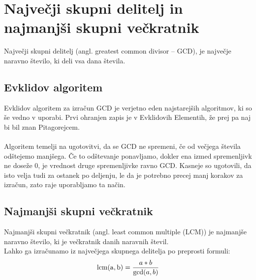 \documentclass[10pt,a4paper,oneside]{book}
\begin{document}
\section{Največji skupni delitelj in najmanjši skupni večkratnik}
Največji skupni delitelj (angl. greatest common divisor -- GCD), je največje naravno število, ki deli vsa dana števila.
\subsection{Evklidov algoritem}
Evklidov algoritem za izračun GCD je verjetno eden najstarejših algoritmov, ki so še vedno v uporabi. Prvi ohranjen zapis je v Evklidovih Elementih\cite{elementi}, že prej pa naj bi bil znan Pitagorejcem. \\
\\
Algoritem temelji na ugotovitvi, da se GCD ne spremeni, če od večjega števila odštejemo manjšega. Če to odštevanje ponavljamo, dokler ena izmed spremenljivk ne doseže 0, je vrednost druge spremenljivke ravno GCD. Kasneje so ugotovili, da isto velja tudi za ostanek po deljenju, le da je potrebno precej manj korakov za izračun, zato raje uporabljamo ta način.


\subsection{Najmanjši skupni večkratnik}
Najmanjši skupni večkratnik (angl. least common multiple (LCM)) je najmanjše naravno število, ki je večkratnik danih naravnih števil.\\
Lahko ga izračunamo iz največjega skupnega delitelja po preprosti formuli:
\[ \operatorname{lcm(a,b)}={a*b \over \operatorname{gcd}(a,b)}\]
%

\end{document}
